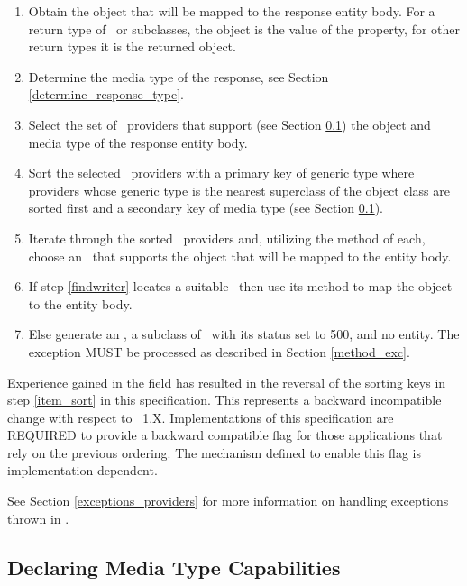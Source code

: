 \begin{enumerate}
\item Obtain the object that will be mapped to the response entity body. For a return type of \Response\ or subclasses, the object is the value of the  property, for other return types it is the returned object.
\item Determine the media type of the response, see Section \ref{determine_response_type}.
\item Select the set of \MsgWrite\ providers that support (see Section \ref{declaring_provider_capabilities}) the object and media type of the response entity body.
\item\label{item_sort} Sort the selected \MsgWrite\ providers with a primary key of generic type where providers whose generic type is the nearest superclass of the object class are sorted first and a secondary key of media type (see Section \ref{declaring_provider_capabilities}).
\item\label{findwriter} Iterate through the sorted \MsgWrite\ providers and, utilizing the  method of each, choose an \MsgWrite\ that supports the object that will be mapped to the entity body.
\item If step \ref{findwriter} locates a suitable \MsgWrite\ then use its  method to map the object to the entity body. 
\item Else generate an , a subclass of \WebAppExc\ with its status set to 500, and no entity. The exception MUST be processed as described in Section \ref{method_exc}.
\end{enumerate}

Experience gained in the field has resulted in the reversal of the sorting keys in step
\ref{item_sort} in this specification. This represents a backward incompatible change
with respect to \jaxrs\ 1.X. Implementations of this specification are REQUIRED to
provide a backward compatible flag for those applications that rely on the previous
ordering. The mechanism defined to enable this flag is implementation dependent.

See Section \ref{exceptions_providers} for more information on handling exceptions thrown in \MsgWrite{}.

\subsection{Declaring Media Type Capabilities}
\label{declaring_provider_capabilities}

